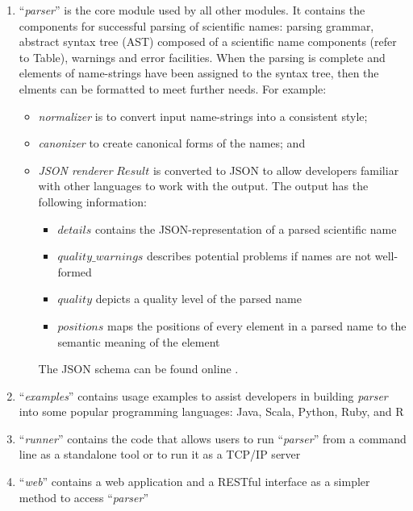 \documentclass{bmcart}
\begin{document}
\begin{enumerate}

  \item ``\textit{parser}'' is the core module used by all other modules. It
    contains the components for successful parsing of scientific names: parsing
    grammar, abstract syntax tree (AST) composed of a scientific name
    components (refer to Table), warnings and error facilities.  When the
    parsing is complete and elements of name-strings have been assigned to the
    syntax tree, then the elments can be formatted to meet further needs.  For
    example:


\begin{itemize}

  \item \textit{normalizer} is to convert input name-strings into a consistent
    style;

  \item \textit{canonizer} to create canonical forms of the names; and

  \item \textit{JSON renderer}  $Result$ is converted to JSON
    \cite{bray2014javascript} to allow developers familiar with other languages
    to work with the output.  The output has the following information:


    \begin{itemize}

      \item $details$ contains the JSON-representation of a parsed scientific
        name

      \item $quality\_warnings$ describes potential problems if names are not
        well-formed

      \item $quality$ depicts a quality level of the parsed name

      \item $positions$ maps the positions of every element in a parsed name to
        the semantic meaning of the element

    \end{itemize}

The JSON schema can be found online \cite{gnparser-json}.


\end{itemize}




  \item ``\textit{examples}'' contains usage examples to assist developers in building \textit{parser} into some popular programming languages: Java, Scala, Python, Ruby, and R
  \item ``\textit{runner}'' contains the code that allows users to run ``\textit{parser}''
  from a command line as a standalone tool or to run it as a TCP/IP server
  \item ``\textit{web}'' contains a web application and a RESTful interface as a simpler method to access ``\textit{parser}''
\end{enumerate}
\end{document}
